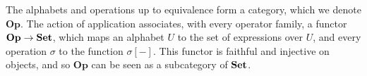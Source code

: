 
\newcommand{\Op}{\ensuremath{\mathbf{Op}}}

The alphabets and operations up to equivalence form
a category, which we denote $\Op$.
The action of application associates, with every operator family, a functor $\Op \rightarrow \Set$,
which maps an alphabet $U$ to the set of expressions over $U$, and every operation $\sigma$ to the function $\sigma[-]$.
This functor is faithful and injective on objects, and so $\Op$ can be seen as a subcategory of $\mathbf{Set}$.

\begin{code}%
\>[0]\<[2]%
\>[2] \AgdaSymbol{:}  \AgdaSymbol{\{}\AgdaSymbol{\}} \AgdaSymbol{\{}\AgdaSymbol{\}} \AgdaSymbol{\{}\AgdaSymbol{\}} \AgdaSymbol{\{}\AgdaSymbol{\}} \<[28]%
\>[28]\<%
\\
\>[2]\<[4]%
\>[4]\AgdaSymbol{\{} \AgdaSymbol{:}   \AgdaSymbol{\}} \AgdaSymbol{\{} \AgdaSymbol{:}   \AgdaSymbol{\}} \AgdaSymbol{\{} \AgdaSymbol{:}   \AgdaSymbol{\}}  \<[45]%
\>[45]\<%
\\
\>[2]\<[4]%
\>[4]  \AgdaSymbol{(}  \AgdaSymbol{)}  \AgdaSymbol{(}  \AgdaSymbol{)}  \<%
\end{code}


